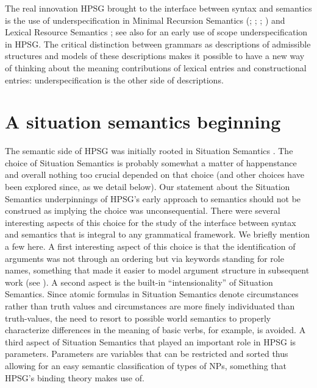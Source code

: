 \documentclass[output=paper]{langsci/langscibook}
\begin{document}
The real innovation HPSG brought to the interface between syntax and semantics is the use of underspecification in Minimal Recursion Semantics (\citealt*{Copestakeetal1995}; \citealt{Egg1998}; \citealt*{Copestakeetal2001}; \citealt*{Copestakeetal2005}) and Lexical Resource Semantics \citep{RichterandSailer2001}; see also \citealt{Nerbonne1993a} for an early use of scope underspecification in HPSG. The critical distinction between grammars as descriptions of admissible structures and models of these descriptions makes it possible to have a new way of thinking about the meaning contributions of lexical entries and constructional entries: underspecification is the other side of descriptions. 

\section{A situation semantics beginning}

The semantic side of HPSG was initially rooted in Situation Semantics \citep[Chapter 4]{PollardandSag1987}. The choice of Situation Semantics is probably somewhat a matter of happenstance and overall nothing too crucial depended on that choice (and other choices have been explored since, as we detail below). Our statement about the Situation Semantics underpinnings of HPSG's early approach to semantics should not be construed as implying the choice was unconsequential. There were several interesting aspects of this choice for the study of the interface between syntax and semantics that is integral to any grammatical framework. We briefly mention a few here. A first interesting aspect of this choice is that the identification of arguments was not through an ordering but via keywords standing for role names, something that made it easier to model argument structure in subsequent work (see ). A second aspect is the built-in ``intensionality'' of Situation Semantics. Since atomic formulas in Situation Semantics denote circumstances rather than truth values and circumstances are more finely individuated than truth-values, the need to resort to possible world semantics to properly characterize differences in the meaning of basic verbs, for example, is avoided. A third aspect of Situation Semantics that played an important role in HPSG is parameters. Parameters are variables that can be restricted and sorted thus allowing for an easy semantic classification of types of NPs, something that HPSG's binding theory makes use of.
\end{document}
